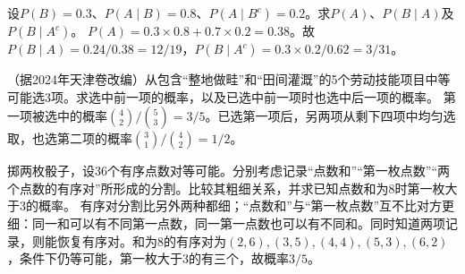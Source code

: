 设\(P(B)=0.3\)、\(P(A\mid B)=0.8\)、\(P(A\mid B^c)=0.2\)。求\(P(A)\)、\(P(B\mid A)\)及\(P(B\mid A^c)\)。
\solutionanswer
\(P(A)=0.3\times0.8+0.7\times0.2=0.38\)。故\(P(B\mid A)=0.24/0.38=12/19\)，\(P(B\mid A^c)=0.3\times0.2/0.62=3/31\)。


（据2024年天津卷改编）从包含“整地做畦”和“田间灌溉”的5个劳动技能项目中等可能选3项。求选中前一项的概率，以及已选中前一项时也选中后一项的概率。
\solutionanswer
第一项被选中的概率\(\binom42/\binom53=3/5\)。已选第一项后，另两项从剩下四项中均匀选取，也选第二项的概率\(\binom31/\binom42=1/2\)。


掷两枚骰子，设36个有序点数对等可能。分别考虑记录“点数和”“第一枚点数”“两个点数的有序对”所形成的分割。比较其粗细关系，并求已知点数和为8时第一枚大于3的概率。
\solutionanswer
有序对分割比另外两种都细；“点数和”与“第一枚点数”互不比对方更细：同一和可以有不同第一点数，同一第一点数也可以有不同和。同时知道两项记录，则能恢复有序对。和为8的有序对为\((2,6),(3,5),(4,4),(5,3),(6,2)\)，条件下仍等可能，第一枚大于3的有三个，故概率\(3/5\)。
\par
